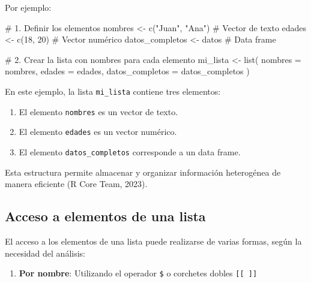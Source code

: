 \documentclass[
  spanish,
  a4paper,
  DIV=11,
  numbers=noendperiod,
  onepage,
  openany]{scrreprt}
\newenvironment{Shaded}{\begin{snugshade}}{\end{snugshade}}
\newcommand{\AttributeTok}[1]{\textcolor[rgb]{0.40,0.45,0.13}{#1}}
\newcommand{\CommentTok}[1]{\textcolor[rgb]{0.37,0.37,0.37}{#1}}
\newcommand{\DecValTok}[1]{\textcolor[rgb]{0.68,0.00,0.00}{#1}}
\newcommand{\FunctionTok}[1]{\textcolor[rgb]{0.28,0.35,0.67}{#1}}
\newcommand{\NormalTok}[1]{\textcolor[rgb]{0.00,0.23,0.31}{#1}}
\newcommand{\OtherTok}[1]{\textcolor[rgb]{0.00,0.23,0.31}{#1}}
\newcommand{\StringTok}[1]{\textcolor[rgb]{0.13,0.47,0.30}{#1}}
\providecommand{\tightlist}{%
  \setlength{\itemsep}{0pt}\setlength{\parskip}{0pt}}
\begin{document}
Por ejemplo:

\begin{Shaded}
\begin{Highlighting}[]
\CommentTok{\# 1. Definir los elementos}
\NormalTok{nombres }\OtherTok{\textless{}{-}} \FunctionTok{c}\NormalTok{(}\StringTok{"Juan"}\NormalTok{, }\StringTok{"Ana"}\NormalTok{)      }\CommentTok{\# Vector de texto}
\NormalTok{edades }\OtherTok{\textless{}{-}} \FunctionTok{c}\NormalTok{(}\DecValTok{18}\NormalTok{, }\DecValTok{20}\NormalTok{)              }\CommentTok{\# Vector numérico}
\NormalTok{datos\_completos }\OtherTok{\textless{}{-}}\NormalTok{ datos         }\CommentTok{\# Data frame}

\CommentTok{\# 2. Crear la lista con nombres para cada elemento}
\NormalTok{mi\_lista }\OtherTok{\textless{}{-}} \FunctionTok{list}\NormalTok{(}
  \AttributeTok{nombres =}\NormalTok{ nombres,}
  \AttributeTok{edades =}\NormalTok{ edades,}
  \AttributeTok{datos\_completos =}\NormalTok{ datos\_completos}
\NormalTok{)}
\end{Highlighting}
\end{Shaded}

En este ejemplo, la lista \texttt{mi\_lista} contiene tres elementos:

\begin{enumerate}
\def\labelenumi{\arabic{enumi}.}
\item
  El elemento \texttt{nombres} es un vector de texto.
\item
  El elemento \texttt{edades} es un vector numérico.
\item
  El elemento \texttt{datos\_completos} corresponde a un data frame.
\end{enumerate}

Esta estructura permite almacenar y organizar información heterogénea de
manera eficiente (R Core Team, 2023).

\subsection{Acceso a elementos de una
lista}\label{acceso-a-elementos-de-una-lista}

El acceso a los elementos de una lista puede realizarse de varias
formas, según la necesidad del análisis:

\begin{enumerate}
\def\labelenumi{\arabic{enumi}.}
\tightlist
\item
  \textbf{Por nombre}: Utilizando el operador \texttt{\$} o corchetes
  dobles \texttt{{[}{[}\ {]}{]}}
\end{enumerate}
\end{document}
